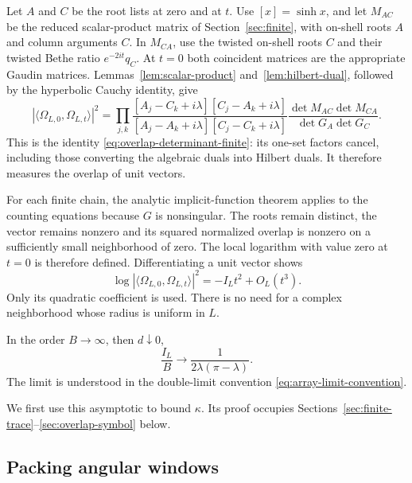Let \(A\) and \(C\) be the root lists at zero and at \(t\).
Use \([x]=\sinh x\), and let \(M_{AC}\) be the reduced scalar-product
matrix of Section~\ref{sec:finite}, with on-shell roots \(A\) and column
arguments \(C\). In \(M_{CA}\), use the twisted on-shell roots \(C\)
and their twisted Bethe ratio \(e^{-2it}q_C\). At \(t=0\) both coincident
matrices are the appropriate Gaudin matrices. Lemmas~\ref{lem:scalar-product}
and~\ref{lem:hilbert-dual}, followed by the hyperbolic Cauchy identity, give
\begin{equation}\label{eq:exact-overlap}
 |\langle\Omega_{L,0},\Omega_{L,t}\rangle|^2
 =
 \prod_{j,k}
 \frac{[A_j-C_k+i\lambda][C_j-A_k+i\lambda]}
      {[A_j-A_k+i\lambda][C_j-C_k+i\lambda]}
 \frac{\det M_{AC}\det M_{CA}}{\det G_A\det G_C}.
\end{equation}
This is the identity \eqref{eq:overlap-determinant-finite}: its
one-set factors cancel, including those converting the algebraic duals
into Hilbert duals. It therefore measures the overlap of unit vectors.

For each finite chain, the analytic implicit-function theorem applies
to the counting equations because \(G\) is nonsingular.
The roots remain distinct, the vector remains nonzero and its squared
normalized overlap is nonzero on a sufficiently small neighborhood of
zero. The local logarithm with value zero at \(t=0\) is therefore defined.
Differentiating a unit vector shows
\begin{equation}\label{eq:overlap-quadratic}
 \log|\langle\Omega_{L,0},\Omega_{L,t}\rangle|^2
       =-I_Lt^2+O_L(t^3).
\end{equation}
Only its quadratic coefficient is used. There is no need for a
complex neighborhood whose radius is uniform in \(L\).

\begin{lemma}\label{lem:overlap-asymptotic}
In the order \(B\to\infty\), then \(d\downarrow0\),
\begin{equation}\label{eq:overlap-density}
 \frac{I_L}{B}\longrightarrow\frac1{2\lambda(\pi-\lambda)}.
\end{equation}
The limit is understood in the double-limit convention
\eqref{eq:array-limit-convention}.
\end{lemma}

We first use this asymptotic to bound \(\kappa\). Its proof occupies
Sections~\ref{sec:finite-trace}--\ref{sec:overlap-symbol} below.

\subsection{Packing angular windows}

